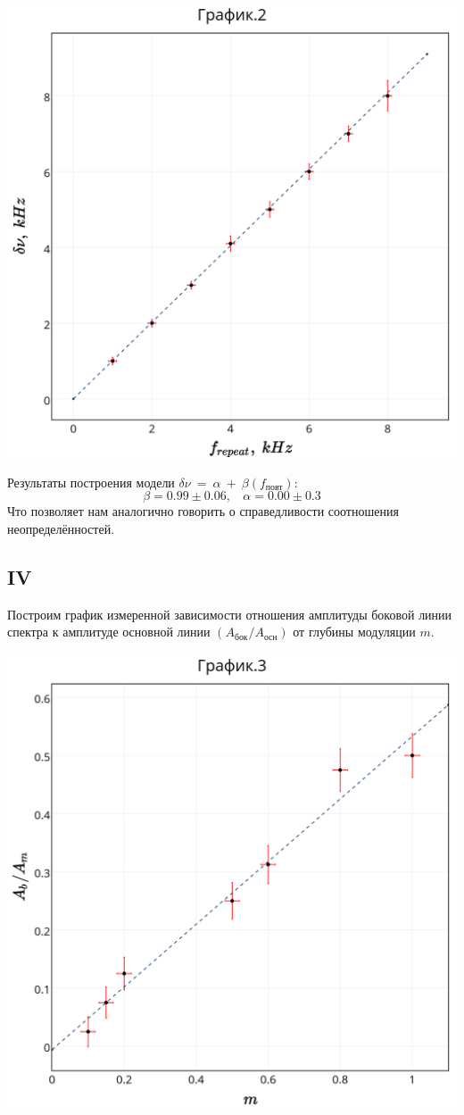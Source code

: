 \includegraphics[scale = 0.20]{my_plot2.png}

Результаты построения модели $\delta{\nu}~=~\alpha~+~\beta(f_\text{повт})$:
$$ \beta = 0.99 \pm 0.06,~~~~
 \alpha = 0.00 \pm 0.3$$
Что позволяет нам аналогично говорить о справедливости соотношения неопределённостей. 

\subsection{\label{sec:level2}IV}

Построим график измеренной зависимости отношения амплитуды боковой линии спектра к амплитуде основной линии $(A_\text{бок}/A_\text{осн})$ от глубины модуляции $m$.\\
\\
\includegraphics[scale = 0.20]{my_plot3.png}


